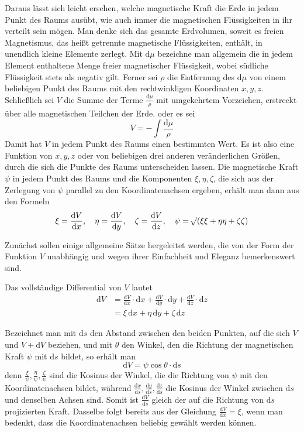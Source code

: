Daraus lässt sich leicht ersehen, welche magnetische Kraft die Erde in jedem Punkt des Raums ausübt, wie auch immer die magnetischen Flüssigkeiten in ihr verteilt sein mögen. Man denke sich das gesamte Erdvolumen, soweit es freien Magnetismus, das heißt getrennte magnetische Flüssigkeiten, enthält, in unendlich kleine Elemente zerlegt. Mit $\mathrm{d}\mu$ bezeichne man allgemein die in jedem Element enthaltene Menge freier magnetischer Flüssigkeit, wobei südliche Flüssigkeit stets als negativ gilt. Ferner sei $\rho$ die Entfernung des $\mathrm{d}\mu$ von einem beliebigen Punkt des Raums mit den rechtwinkligen Koordinaten $x,y,z$. Schließlich sei $V$ die Summe der Terme $\frac{\mathrm{d}\mu}{\rho}$ mit umgekehrtem Vorzeichen, erstreckt über alle magnetischen Teilchen der Erde. oder es sei
\[
V=-\int\frac{\mathrm{d}\mu}{\rho}
\]
Damit hat $V$ in jedem Punkt des Raums einen bestimmten Wert. Es ist also eine Funktion von $x,y,z$ oder von beliebigen drei anderen veränderlichen Größen, durch die sich die Punkte des Raums unterscheiden lassen. Die magnetische Kraft $\psi$ in jedem Punkt des Raums und die Komponenten $\xi,\eta,\zeta$, die sich aus der Zerlegung von $\psi$ parallel zu den Koordinatenachsen ergeben, erhält man dann aus den Formeln
\[
\xi=\frac{\mathrm{d}V}{\mathrm{d}x},\quad \eta=\frac{\mathrm{d}V}{\mathrm{d}y},\quad \zeta=\frac{\mathrm{d}V}{\mathrm{d}z},\quad \psi=\mathord{{}^{}\!\surd}(\xi\xi+\eta\eta+\zeta\zeta)
\]

Zunächst sollen einige allgemeine Sätze hergeleitet werden, die von der Form der Funktion $V$ unabhängig und wegen ihrer Einfachheit und Eleganz bemerkenswert sind.

Das vollständige Differential von $V$ lautet
\[
\begin{aligned}
\mathrm{d}V&=\frac{\mathrm{d}V}{\mathrm{d}x}\cdot\mathrm{d}x+\frac{\mathrm{d}V}{\mathrm{d}y}\cdot\mathrm{d}y+\frac{\mathrm{d}V}{\mathrm{d}z}\cdot\mathrm{d}z\\
&=\xi\,\mathrm{d}x+\eta\,\mathrm{d}y+\zeta\,\mathrm{d}z
\end{aligned}
\]

Bezeichnet man mit $\mathrm{d}s$ den Abstand zwischen den beiden Punkten, auf die sich $V$ und $V+\mathrm{d}V$ beziehen, und mit $\theta$ den Winkel, den die Richtung der magnetischen Kraft $\psi$ mit $\mathrm{d}s$ bildet, so erhält man
\[
\mathrm{d}V=\psi\cos\theta\cdot\mathrm{d}s
\]
denn $\frac{\xi}{\psi},\frac{\eta}{\psi},\frac{\zeta}{\psi}$ sind die Kosinus der Winkel, die die Richtung von $\psi$ mit den Koordinatenachsen bildet, während $\frac{\mathrm{d}x}{\mathrm{d}s},\frac{\mathrm{d}y}{\mathrm{d}s},\frac{\mathrm{d}z}{\mathrm{d}s}$ die Kosinus der Winkel zwischen $\mathrm{d}s$ und denselben Achsen sind. Somit ist $\frac{\mathrm{d}V}{\mathrm{d}s}$ gleich der auf die Richtung von $\mathrm{d}s$ projizierten Kraft. Dasselbe folgt bereits aus der Gleichung $\frac{\mathrm{d}V}{\mathrm{d}x}=\xi$, wenn man bedenkt, dass die Koordinatenachsen beliebig gewählt werden können.

